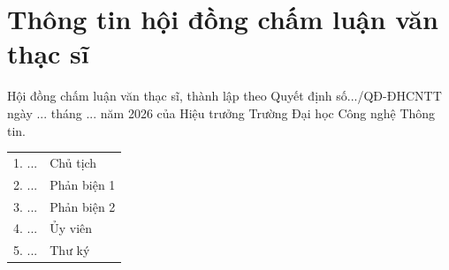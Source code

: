 \chapter*{\centering\Large{Thông tin hội đồng chấm luận văn thạc sĩ}}
Hội đồng chấm luận văn thạc sĩ, thành lập theo Quyết định số.../QĐ-ĐHCNTT ngày ... tháng ... năm 2026 của Hiệu trưởng Trường Đại học Công nghệ Thông tin.
\begin{center}
    \begin{tabular}{ p{} p{}}
        1. ...  & Chủ tịch \\
        2. ...  & Phản biện 1 \\
        3. ...  & Phản biện 2 \\
        4. ...  & Ủy viên \\
        5. ...  & Thư ký \\
    \end{tabular}
\end{center}
